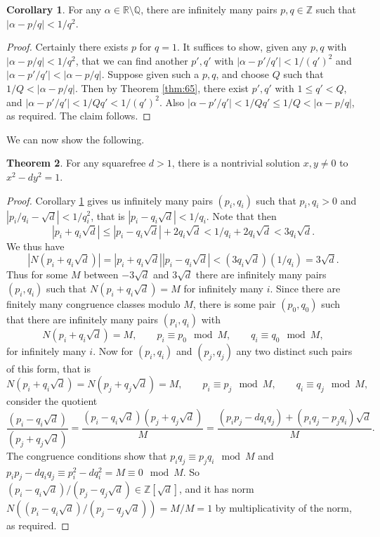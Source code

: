 \documentclass{article}
\newcommand{\Z}{\mathbb{Z}}
\newcommand{\Q}{\mathbb{Q}}
\newcommand{\R}{\mathbb{R}}
\newcommand{\rb}[1]{\left( #1 \right)}
\renewcommand{\sb}[1]{\left[ #1 \right]}
\newcommand{\abs}[1]{\left\lvert #1 \right\rvert}
\theoremstyle{definition}\newtheorem{definition}{Definition}
\theoremstyle{definition}\newtheorem{remark}[definition]{Remark}
\theoremstyle{definition}\newtheorem*{example}{Example}
\theoremstyle{definition}\newtheorem*{note}{Note}
\newtheorem{theorem}[definition]{Theorem}
\newtheorem{corollary}[definition]{Corollary}
\begin{document}
\begin{corollary}
\label{cor:66}
For any $ \alpha \in \R \setminus \Q $, there are infinitely many pairs $ p, q \in \Z $ such that $ \abs{\alpha - p / q} < 1 / q^2 $.
\end{corollary}

\begin{proof}
Certainly there exists $ p $ for $ q = 1 $. It suffices to show, given any $ p, q $ with $ \abs{\alpha - p / q} < 1 / q^2 $, that we can find another $ p', q' $ with $ \abs{\alpha - p' / q'} < 1 / \rb{q'}^2 $ and $ \abs{\alpha - p' / q'} < \abs{\alpha - p / q} $. Suppose given such a $ p, q $, and choose $ Q $ such that $ 1 / Q < \abs{\alpha - p / q} $. Then by Theorem \ref{thm:65}, there exist $ p', q' $ with $ 1 \le q' < Q $, and $ \abs{\alpha - p' / q'} < 1 / Qq' < 1 / \rb{q'}^2 $. Also $ \abs{\alpha - p' / q'} < 1 / Qq' \le 1 / Q < \abs{\alpha - p / q} $, as required. The claim follows.
\end{proof}

We can now show the following.

\begin{theorem}
For any squarefree $ d > 1 $, there is a nontrivial solution $ x, y \ne 0 $ to $ x^2 - dy^2 = 1 $.
\end{theorem}

\begin{proof}
Corollary \ref{cor:66} gives us infinitely many pairs $ \rb{p_i, q_i} $ such that $ p_i, q_i > 0 $ and $ \abs{p_i / q_i - \sqrt{d}} < 1 / q_i^2 $, that is $ \abs{p_i - q_i\sqrt{d}} < 1 / q_i $. Note that then
$$ \abs{p_i + q_i\sqrt{d}} \le \abs{p_i - q_i\sqrt{d}} + 2q_i\sqrt{d} < 1 / q_i + 2q_i\sqrt{d} < 3q_i\sqrt{d}. $$
We thus have
$$ \abs{N\rb{p_i + q_i\sqrt{d}}} = \abs{p_i + q_i\sqrt{d}}\abs{p_i - q_i\sqrt{d}} < \rb{3q_i\sqrt{d}}\rb{1 / q_i} = 3\sqrt{d}. $$
Thus for some $ M $ between $ -3\sqrt{d} $ and $ 3\sqrt{d} $ there are infinitely many pairs $ \rb{p_i, q_i} $ such that $ N\rb{p_i + q_i\sqrt{d}} = M $ for infinitely many $ i $. Since there are finitely many congruence classes modulo $ M $, there is some pair $ \rb{p_0, q_0} $ such that there are infinitely many pairs $ \rb{p_i, q_i} $ with
$$ N\rb{p_i + q_i\sqrt{d}} = M, \qquad p_i \equiv p_0 \mod M, \qquad q_i \equiv q_0 \mod M, $$
for infinitely many $ i $. Now for $ \rb{p_i, q_i} $ and $ \rb{p_j, q_j} $ any two distinct such pairs of this form, that is
$$ N\rb{p_i + q_i\sqrt{d}} = N\rb{p_j + q_j\sqrt{d}} = M, \qquad p_i \equiv p_j \mod M, \qquad q_i \equiv q_j \mod M, $$
consider the quotient
$$ \dfrac{\rb{p_i - q_i\sqrt{d}}}{\rb{p_j + q_j\sqrt{d}}} = \dfrac{\rb{p_i - q_i\sqrt{d}}\rb{p_j + q_j\sqrt{d}}}{M} = \dfrac{\rb{p_ip_j - dq_iq_j} + \rb{p_iq_j - p_jq_i}\sqrt{d}}{M}. $$
The congruence conditions show that $ p_iq_j \equiv p_jq_i \mod M $ and $ p_ip_j - dq_iq_j \equiv p_i^2 - dq_i^2 = M \equiv 0 \mod M $. So $ \rb{p_i - q_i\sqrt{d}} / \rb{p_j - q_j\sqrt{d}} \in \Z\sb{\sqrt{d}} $, and it has norm $ N\rb{\rb{p_i - q_i\sqrt{d}} / \rb{p_j - q_j\sqrt{d}}} = M / M = 1 $ by multiplicativity of the norm, as required.
\end{proof}
\end{document}
